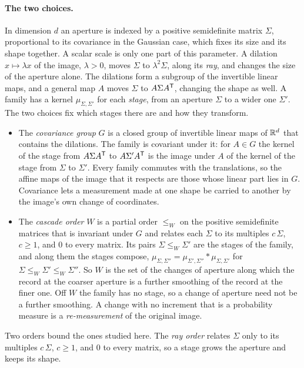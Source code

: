 \paragraph{The two choices.} In dimension $d$ an aperture is indexed by a positive semidefinite matrix
$\Sigma$, proportional to its covariance in the Gaussian case, which fixes its size and its shape
together. A scalar scale is only one part of this parameter. A dilation $x \mapsto \lambda x$
of the image, $\lambda > 0$, moves $\Sigma$ to $\lambda^2\Sigma$, along its \emph{ray}, and changes
the size of the aperture alone. The dilations form a subgroup of the invertible linear maps, and a
general map $A$ moves $\Sigma$ to $A\Sigma A^{\mathsf{T}}$, changing the shape as well. A family has a kernel
$\mu_{\Sigma,\Sigma'}$ for each \emph{stage}, from an aperture $\Sigma$ to a wider one $\Sigma'$. The
two choices fix which stages there are and how they transform.
\begin{itemize}
\item The \emph{covariance group} $G$ is a closed group of invertible linear maps of $\mathbb{R}^d$ that
contains the dilations. The family is covariant under it: for $A \in G$ the kernel of the stage from
$A\Sigma A^{\mathsf{T}}$ to $A\Sigma'A^{\mathsf{T}}$ is the image under $A$ of the kernel of the stage from $\Sigma$
to $\Sigma'$. Every family commutes with the translations, so the affine maps of the image that it
respects are those whose linear part lies in $G$. Covariance lets a measurement made at one shape be
carried to another by the image's own change of coordinates.
\item The \emph{cascade order} $W$ is a partial order $\le_W$ on the positive semidefinite matrices
that is invariant under $G$ and relates each $\Sigma$ to its multiples $c\,\Sigma$, $c \ge 1$, and $0$
to every matrix. Its pairs $\Sigma \le_W \Sigma'$ are the stages
of the family, and along them the stages compose,
$\mu_{\Sigma,\Sigma''} = \mu_{\Sigma',\Sigma''} * \mu_{\Sigma,\Sigma'}$ for
$\Sigma \le_W \Sigma' \le_W \Sigma''$. So $W$ is the set of the changes of aperture along which the
record at the coarser aperture is a further smoothing of the record at the finer one. Off $W$ the family
has no stage, so a change of aperture need not be a further smoothing. A change with no increment that
is a probability measure is a \emph{re-measurement} of the original image.
\end{itemize}
Two orders bound the ones studied here. The \emph{ray order} relates $\Sigma$ only to its multiples
$c\,\Sigma$, $c \ge 1$, and $0$ to every matrix, so a stage grows the aperture and keeps its shape.
